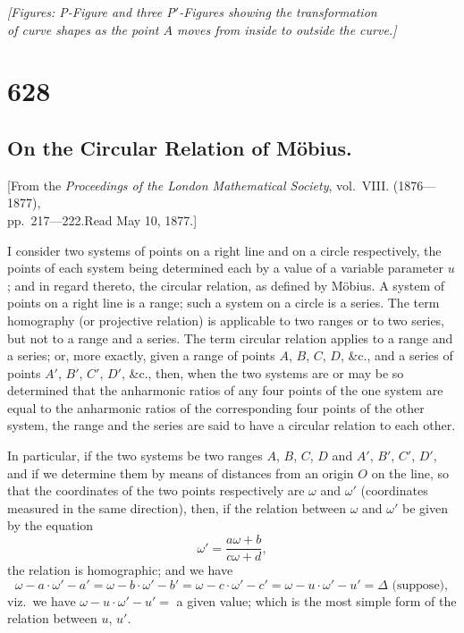 \documentclass[11pt,a4paper]{book}
\begin{document}
\begin{center}
\textit{[Figures: P-Figure and three P$'$-Figures showing the transformation\\
of curve shapes as the point $A$ moves from inside to outside the curve.]}
\end{center}

\newpage

\section*{628}
\subsection*{On the Circular Relation of M\"obius.}

\begin{center}
\small
[From the \textit{Proceedings of the London Mathematical Society}, vol.~VIII. (1876---1877),\\
pp.~217---222.\quad Read May 10, 1877.]
\end{center}

\medskip
\noindent
I consider two systems of points on a right line and on a circle respectively, the points of each system being determined each by a value of a variable parameter $u$; and in regard thereto, the circular relation, as defined by M\"obius. A system of points on a right line is a range; such a system on a circle is a series. The term homography (or projective relation) is applicable to two ranges or to two series, but not to a range and a series. The term circular relation applies to a range and a series; or, more exactly, given a range of points $A$, $B$, $C$, $D$, \&c., and a series of points $A'$, $B'$, $C'$, $D'$, \&c., then, when the two systems are or may be so determined that the anharmonic ratios of any four points of the one system are equal to the anharmonic ratios of the corresponding four points of the other system, the range and the series are said to have a circular relation to each other.

In particular, if the two systems be two ranges $A$, $B$, $C$, $D$ and $A'$, $B'$, $C'$, $D'$, and if we determine them by means of distances from an origin $O$ on the line, so that the coordinates of the two points respectively are $\omega$ and $\omega'$ (coordinates measured in the same direction), then, if the relation between $\omega$ and $\omega'$ be given by the equation
\[
\omega' = \frac{a\omega + b}{c\omega + d},
\]
the relation is homographic; and we have
\[
\omega - a \cdot \omega' - a' = \omega - b \cdot \omega' - b' = \omega - c \cdot \omega' - c' = \omega - u \cdot \omega' - u' = \Delta \text{ (suppose)},
\]
viz.\ we have $\omega - u \cdot \omega' - u' = $ a given value; which is the most simple form of the relation between $u$, $u'$.
\end{document}
